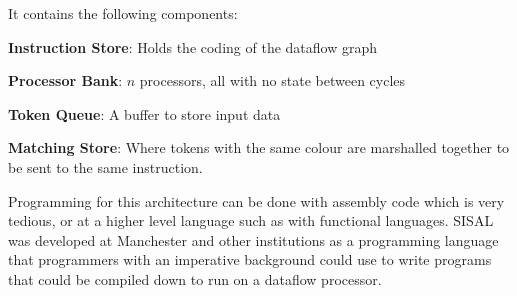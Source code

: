 It contains the following components:

\begin{description}
\item \textbf{Instruction Store}: Holds the coding of the dataflow graph
\item \textbf{Processor Bank}: $n$ processors, all with no state between cycles
\item \textbf{Token Queue}: A buffer to store input data
\item \textbf{Matching Store}: Where tokens with the same colour are marshalled
together to be sent to the same instruction.
\end{description}

Programming for this architecture can be done with assembly code which
is very tedious, or at a higher level language such as with functional
languages. SISAL was developed at Manchester and other institutions as
a programming language that programmers with an imperative background
could use to write programs that could be compiled down to run on a
dataflow processor.

{}


